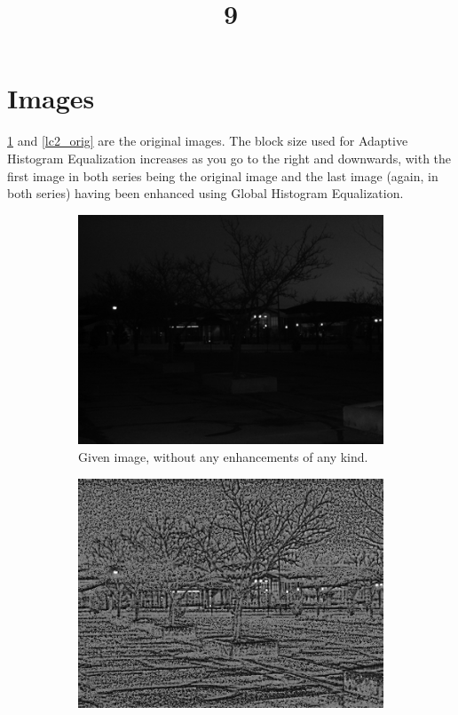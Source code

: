 \documentclass[a4paper, landscape]{article}
\title{9}
\date{}
\begin{document}
\maketitle

\section{Images}
\ref{lc1_orig} and \ref{lc2_orig} are the original images. The block size used for Adaptive Histogram Equalization increases as you go to the right and downwards, with the first image in both series being the original image and the last image (again, in both series) having been enhanced using Global Histogram Equalization.


\begin{figure}
    \centering
    \begin{subfigure}{0.32\linewidth}
        \centering
        \includegraphics[width=\linewidth]{LC1.png}
        \caption{Given image, without any enhancements of any kind.}
        \label{lc1_orig}
    \end{subfigure}
    \begin{subfigure}{0.32\linewidth}
        \centering
        \includegraphics[width=\linewidth, keepaspectratio]{smol_enhanced_LC1.png}

\end{subfigure}
\end{figure}
\end{document}
